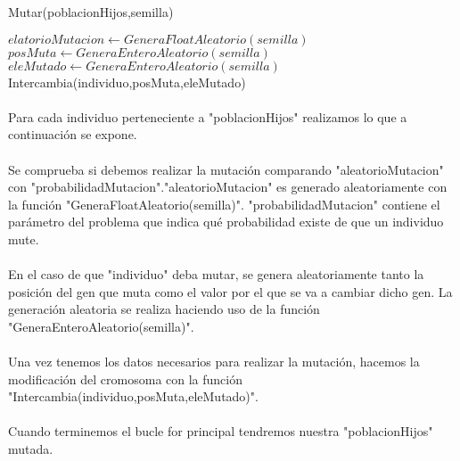 	\begin{algorithm}[H]
		\caption{Mutar(poblacionHijos,semilla)}
		\begin{algorithmic}
			\STATE $elatorioMutacion\leftarrow GeneraFloatAleatorio(semilla)$
			\STATE $posMuta \leftarrow GeneraEnteroAleatorio(semilla)$
			\STATE $eleMutado \leftarrow GeneraEnteroAleatorio(semilla)$
			\STATE Intercambia(individuo,posMuta,eleMutado)
			\ENDIF
			\ENDFOR
		\end{algorithmic}
	\end{algorithm}

	\paragraph{}Para cada individuo perteneciente a "poblacionHijos" realizamos lo que a continuación se expone.
	
	\paragraph{}Se comprueba si debemos realizar la mutación comparando "aleatorioMutacion" con "probabilidadMutacion"."aleatorioMutacion" es generado aleatoriamente con la función "GeneraFloatAleatorio(semilla)". "probabilidadMutacion" contiene el parámetro del problema que indica qué probabilidad existe de que un individuo mute.
	
	\paragraph{}En el caso de que "individuo" deba mutar, se genera aleatoriamente tanto la posición del gen que muta como el valor por el que se va a cambiar dicho gen. La generación aleatoria se realiza haciendo uso de la función "GeneraEnteroAleatorio(semilla)".
	
	\paragraph{}Una vez tenemos los datos necesarios para realizar la mutación, hacemos la modificación del cromosoma con la función "Intercambia(individuo,posMuta,eleMutado)".
	
	\paragraph{}Cuando terminemos el bucle for principal tendremos nuestra "poblacionHijos" mutada.

